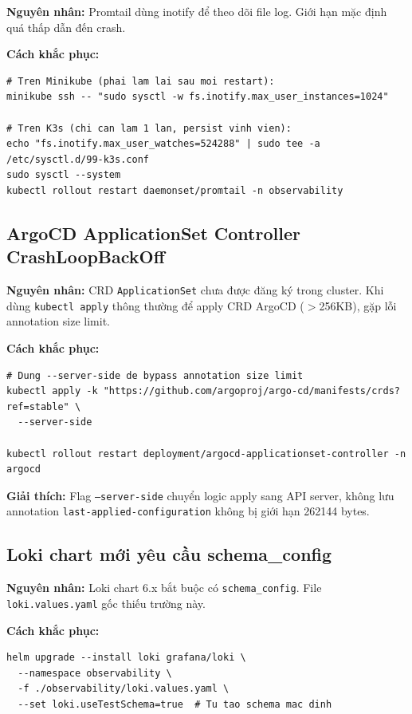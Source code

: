 \textbf{Nguyên nhân:} Promtail dùng inotify để theo dõi file log. Giới hạn mặc định
quá thấp dẫn đến crash.

\textbf{Cách khắc phục:}
\begin{lstlisting}[style=bashstyle]
# Tren Minikube (phai lam lai sau moi restart):
minikube ssh -- "sudo sysctl -w fs.inotify.max_user_instances=1024"

# Tren K3s (chi can lam 1 lan, persist vinh vien):
echo "fs.inotify.max_user_watches=524288" | sudo tee -a /etc/sysctl.d/99-k3s.conf
sudo sysctl --system
kubectl rollout restart daemonset/promtail -n observability
\end{lstlisting}

\subsection{ArgoCD ApplicationSet Controller CrashLoopBackOff}

\textbf{Nguyên nhân:} CRD \texttt{ApplicationSet} chưa được đăng ký trong cluster.
Khi dùng \texttt{kubectl apply} thông thường để apply CRD ArgoCD ($>$256KB),
gặp lỗi annotation size limit.

\textbf{Cách khắc phục:}
\begin{lstlisting}[style=bashstyle]
# Dung --server-side de bypass annotation size limit
kubectl apply -k "https://github.com/argoproj/argo-cd/manifests/crds?ref=stable" \
  --server-side

kubectl rollout restart deployment/argocd-applicationset-controller -n argocd
\end{lstlisting}

\textbf{Giải thích:} Flag \texttt{--server-side} chuyển logic apply sang API server,
không lưu annotation \texttt{last-applied-configuration} \textrightarrow{} không bị giới hạn 262144 bytes.

\subsection{Loki chart mới yêu cầu schema\_config}

\textbf{Nguyên nhân:} Loki chart 6.x bắt buộc có \texttt{schema\_config}.
File \texttt{loki.values.yaml} gốc thiếu trường này.

\textbf{Cách khắc phục:}
\begin{lstlisting}[style=bashstyle]
helm upgrade --install loki grafana/loki \
  --namespace observability \
  -f ./observability/loki.values.yaml \
  --set loki.useTestSchema=true  # Tu tao schema mac dinh
\end{lstlisting}

